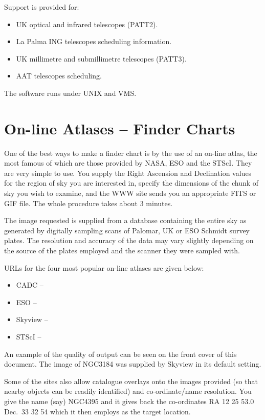 Support is provided for:

\begin{itemize}
\item UK optical and infrared telescopes (PATT2).
\item La Palma ING telescopes scheduling information. 
\item UK millimetre and submillimetre telescopes (PATT3).
\item AAT telescopes scheduling. 
\end{itemize}

The software runs under UNIX and VMS.

\section{On-line Atlases -- Finder Charts} 
\label{sec:atlases}

One of the best ways to make a finder chart is by the use of an on-line
atlas, the most famous of which are those provided by NASA, ESO and the STScI.
They are very simple to use. You supply the Right Ascension and Declination values for the region 
of sky you are interested in, specify the dimensions of the chunk of 
sky you wish to examine, and the WWW site sends you an appropriate FITS or GIF 
file. The whole procedure takes about 3 minutes. 

The image requested is supplied
from a database containing the entire sky as generated by digitally sampling 
scans of Palomar, UK or ESO Schmidt survey plates. The resolution and accuracy of the data may 
vary slightly depending on the source of the plates employed and the scanner 
they were sampled with.

URLs for the four most popular on-line atlases are given below:

\begin{itemize}
\item CADC -- {\CADCref}
\item ESO -- {\HTTPEref}   
\item Skyview -- {\HTTPDref}
\item STScI -- {\HTTPFref}
\end{itemize}

An example of the quality of output can be seen on the front cover of this document.
The image of NGC3184 was supplied by Skyview in its default setting. 

Some of the sites also allow catalogue overlays onto the images provided
(so that nearby objects can be readily identified)
and co-ordinate/name resolution. 
You give the name (say) NGC4395 and 
it gives back the co-ordinates  RA 12 25 53.0  Dec.\ 33 32 54 which it 
then employs as the target location.


